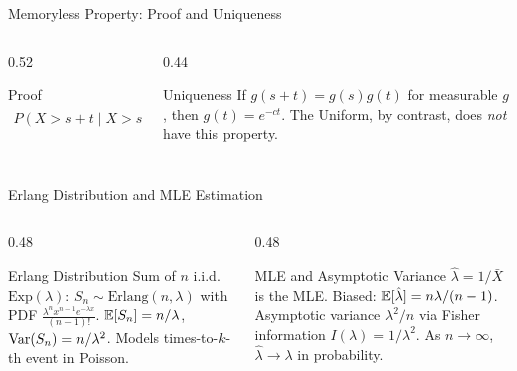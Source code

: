 \documentclass[aspectratio=169,xcolor={dvipsnames,table}]{beamer}
\begin{document}
\begin{frame}{Memoryless Property: Proof and Uniqueness}
	\vspace{-0.15cm}
	\begin{columns}[T]
		\begin{column}{0.52\textwidth}
			\begin{block}{Proof}
				\footnotesize
				\begin{align*}
					P(X > s{+}t \mid X > s) &= \frac{P(X > s+t)}{P(X > s)} = \frac{e^{-\lambda(s+t)}}{e^{-\lambda s}} \\
					&= e^{-\lambda t} = P(X > t).
				\end{align*}
			\end{block}
		\end{column}
		\begin{column}{0.44\textwidth}
			\begin{alertblock}{Uniqueness}
				\footnotesize
				If $g(s+t) = g(s)g(t)$ for measurable $g$, then $g(t) = e^{-ct}$. The Uniform, by contrast, does \emph{not} have this property.
			\end{alertblock}
		\end{column}
	\end{columns}
\end{frame}

\begin{frame}{Erlang Distribution and MLE Estimation}
	\vspace{-0.15cm}
	\begin{columns}[T]
		\begin{column}{0.48\textwidth}
			\begin{block}{Erlang Distribution}
				\footnotesize
				Sum of $n$ i.i.d. $\text{Exp}(\lambda)$: $S_n \sim \text{Erlang}(n, \lambda)$ with PDF $\frac{\lambda^n x^{n-1} e^{-\lambda x}}{(n-1)!}$. $\mathbb{E}[S_n] = n/\lambda$, $\operatorname{Var}(S_n) = n/\lambda^{2}$. Models times-to-$k$-th event in Poisson.
			\end{block}
		\end{column}
		\begin{column}{0.48\textwidth}
			\begin{alertblock}{MLE and Asymptotic Variance}
				\footnotesize
				$\hat{\lambda} = 1/\bar{X}$ is the MLE. Biased: $\mathbb{E}[\hat{\lambda}] = n\lambda/(n-1)$. Asymptotic variance $\lambda^{2}/n$ via Fisher information $I(\lambda) = 1/\lambda^{2}$. As $n \to \infty$, $\hat{\lambda} \to \lambda$ in probability.
			\end{alertblock}
		\end{column}
	\end{columns}
\end{frame}
\end{document}
